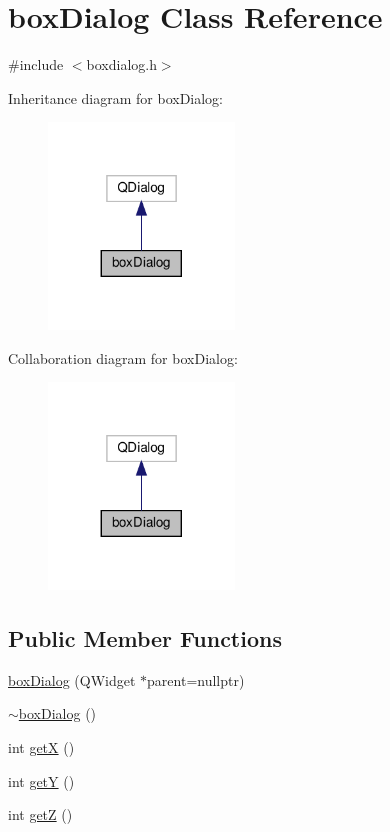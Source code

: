 \hypertarget{classbox_dialog}{}\section{box\+Dialog Class Reference}
\label{classbox_dialog}


{\ttfamily \#include $<$boxdialog.\+h$>$}



Inheritance diagram for box\+Dialog\+:
\nopagebreak
\begin{figure}[H]
\begin{center}
\leavevmode
\includegraphics[width=140pt]{classbox_dialog__inherit__graph}
\end{center}
\end{figure}


Collaboration diagram for box\+Dialog\+:
\nopagebreak
\begin{figure}[H]
\begin{center}
\leavevmode
\includegraphics[width=140pt]{classbox_dialog__coll__graph}
\end{center}
\end{figure}
\subsection*{Public Member Functions}
\begin{DoxyCompactItemize}
\item 
\hyperlink{classbox_dialog_ae5f797660638a57b01a9ac34d8c8e6a2}{box\+Dialog} (Q\+Widget $\ast$parent=nullptr)
\item 
\hyperlink{classbox_dialog_aa0f44ec78ac59d41a1d394e9baaa4252}{$\sim$box\+Dialog} ()
\item 
int \hyperlink{classbox_dialog_ab9b74c010cc7b9ab44bf875ae66ede1c}{getX} ()
\item 
int \hyperlink{classbox_dialog_a85e393c20b1187ffdce852378704a24c}{getY} ()
\item 
int \hyperlink{classbox_dialog_a34b2ce0c94a9f2c486d877d64834b7e3}{getZ} ()
\end{DoxyCompactItemize}


